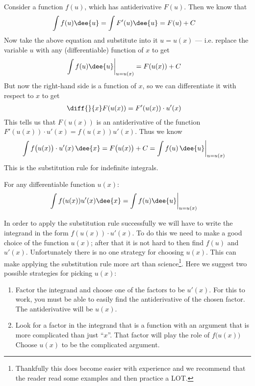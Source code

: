 Consider a function $f(u)$, which has antiderivative $F(u)$. Then we know
that
\begin{align*}
  \int f(u) \dee{u} &= \int F'(u) \dee{u} = F(u) +C
\end{align*}
Now take the above equation and substitute into it $u=u(x)$ --- i.e. replace the
variable $u$ with any (differentiable) function of $x$ to get
\begin{align*}
\int f(u) \dee{u}\bigg|_{u=u(x)} &= F(u(x)) +C
\end{align*}
But now the right-hand side is a function of $x$, so we can differentiate it with respect
to $x$ to get
\begin{align*}
  \diff{}{x} F(u(x)) &= F'(u(x)) \cdot u'(x)
\end{align*}
This tells us that $F(u(x))$ is an antiderivative of the function $F'(u(x))\cdot u'(x)
= f(u(x))u'(x)$. Thus we know
\begin{align*}
    \int f\big(u(x)\big) \cdot u'(x)\,\dee{x}
      &= F\big(u(x)\big) +C
      = \int f(u)\,\dee{u}\bigg|_{u=u(x)}
\end{align*}
This is the substitution rule for indefinite integrals.
\begin{theorem}\label{thm subs
indef}
 For any differentiable function $u(x)$:
\begin{align*}
  \int f(u(x)) u'(x) \dee{x} &= \int f(u)\dee{u}\bigg|_{u=u(x)}
\end{align*}
\end{theorem}
In order to apply the substitution rule successfully we will have to write the integrand
in the form $f(u(x))\cdot u'(x)$. To do this we need to make a good choice of the
function $u(x)$; after that it is not hard to then find $f(u)$ and $u'(x)$.
Unfortunately there is no one strategy for choosing $u(x)$. This can make applying the
substitution rule more art than science\footnote{Thankfully this does become easier with
experience and we recommend that the reader read some examples and then practice a LOT.}.
Here we suggest two possible strategies for picking $u(x)$:
\begin{enumerate}[(1)]
\item Factor the integrand and choose one of the factors to be $u'(x)$. For this to work,
you must be able to easily find the antiderivative of the chosen factor. The
antiderivative will be $u(x)$.
\item Look for a factor in the integrand that is a function with an argument that is more
complicated than just ``$x$''. That factor will play the role of $f\big(u(x)\big)$ Choose
$u(x)$ to be the complicated argument.
\end{enumerate}
